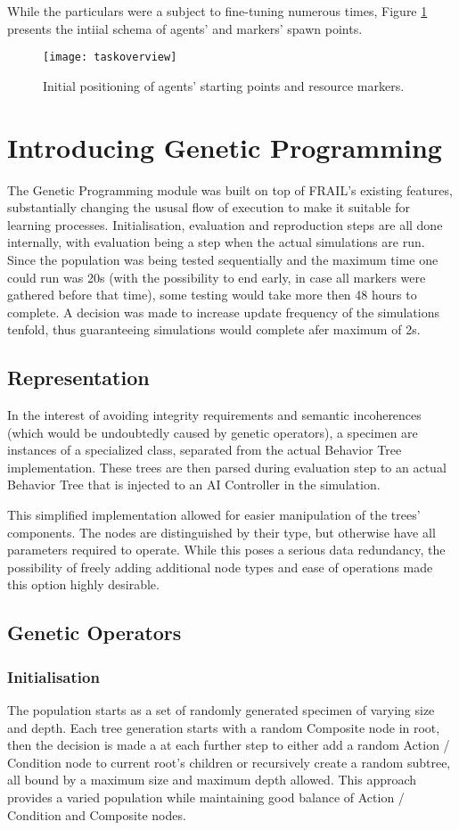 While the particulars were a subject to fine-tuning numerous times, Figure \ref{fig:x taskoverview} presents the intiial schema of agents' and markers' spawn points.
\begin{figure}[h]
    \centering
    \texttt{[image: taskoverview]}
    \caption{Initial positioning of agents' starting points and resource markers.}
    \label{fig:x taskoverview}
\end{figure}
\section{Introducing Genetic Programming} %
The Genetic Programming module was built on top of FRAIL's existing features, substantially changing the ususal flow of execution to make it suitable for learning processes. Initialisation, evaluation and reproduction steps are all done internally, with evaluation being a step when the actual simulations are run. Since the population was being tested sequentially and the maximum time one could run was 20s (with the possibility to end early, in case all markers were gathered before that time), some testing would take more then 48 hours to complete. A decision was made to increase update frequency of the simulations tenfold, thus guaranteeing simulations would complete afer maximum of 2s.
\subsection{Representation}
In the interest of avoiding integrity requirements and semantic incoherences (which would be undoubtedly caused by genetic operators), a specimen are instances of a specialized class, separated from the actual Behavior Tree implementation. These trees are then parsed during evaluation step to an actual Behavior Tree that is injected to an AI Controller in the simulation.

This simplified implementation allowed for easier manipulation of the trees' components. The nodes are distinguished by their type, but otherwise have all parameters required to operate. While this poses a serious data redundancy, the possibility of freely adding additional node types and ease of operations made this option highly desirable.
\subsection{Genetic Operators} %
\subsubsection{Initialisation}
The population starts as a set of randomly generated specimen of varying size and depth. Each tree generation starts with a random Composite node in root, then the decision is made a at each further step to either add a random Action / Condition node to current root's children or recursively create a random subtree, all bound by a maximum size and maximum depth allowed. This approach provides a varied population while maintaining good balance of Action / Condition and Composite nodes.
